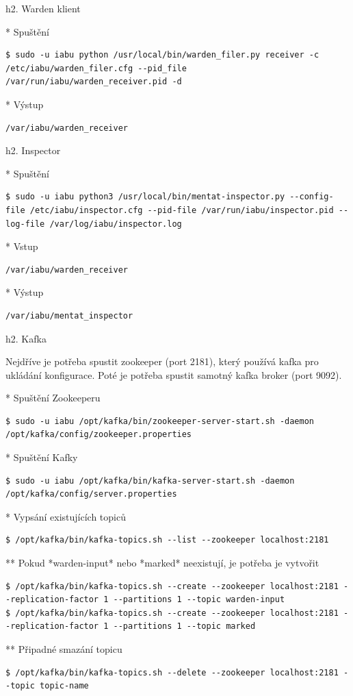 \documentclass[a4paper]{article} %
\begin{document}
h2. Warden klient

* Spuštění
\begin{lstlisting}[]
$ sudo -u iabu python /usr/local/bin/warden_filer.py receiver -c /etc/iabu/warden_filer.cfg --pid_file /var/run/iabu/warden_receiver.pid -d
\end{lstlisting}

* Výstup
\begin{lstlisting}[]
/var/iabu/warden_receiver
\end{lstlisting}

h2. Inspector

* Spuštění
\begin{lstlisting}[]
$ sudo -u iabu python3 /usr/local/bin/mentat-inspector.py --config-file /etc/iabu/inspector.cfg --pid-file /var/run/iabu/inspector.pid --log-file /var/log/iabu/inspector.log
\end{lstlisting}

* Vstup
\begin{lstlisting}[]/var/iabu/warden_receiver
\end{lstlisting}
* Výstup
\begin{lstlisting}[]
/var/iabu/mentat_inspector
\end{lstlisting}

h2. Kafka

Nejdříve je potřeba spustit zookeeper (port 2181), který používá kafka pro ukládání konfigurace. Poté je potřeba spustit samotný kafka broker (port 9092).

* Spuštění Zookeeperu
\begin{lstlisting}[]
$ sudo -u iabu /opt/kafka/bin/zookeeper-server-start.sh -daemon /opt/kafka/config/zookeeper.properties
\end{lstlisting}

* Spuštění Kafky
\begin{lstlisting}[]
$ sudo -u iabu /opt/kafka/bin/kafka-server-start.sh -daemon /opt/kafka/config/server.properties
\end{lstlisting}

* Vypsání existujících topiců
\begin{lstlisting}[]
$ /opt/kafka/bin/kafka-topics.sh --list --zookeeper localhost:2181
\end{lstlisting}
** Pokud *warden-input* nebo *marked* neexistují, je potřeba je vytvořit
\begin{lstlisting}[]
$ /opt/kafka/bin/kafka-topics.sh --create --zookeeper localhost:2181 --replication-factor 1 --partitions 1 --topic warden-input
$ /opt/kafka/bin/kafka-topics.sh --create --zookeeper localhost:2181 --replication-factor 1 --partitions 1 --topic marked
\end{lstlisting}
** Připadné smazání topicu
\begin{lstlisting}[]
$ /opt/kafka/bin/kafka-topics.sh --delete --zookeeper localhost:2181 --topic topic-name
\end{lstlisting}
\end{document}
